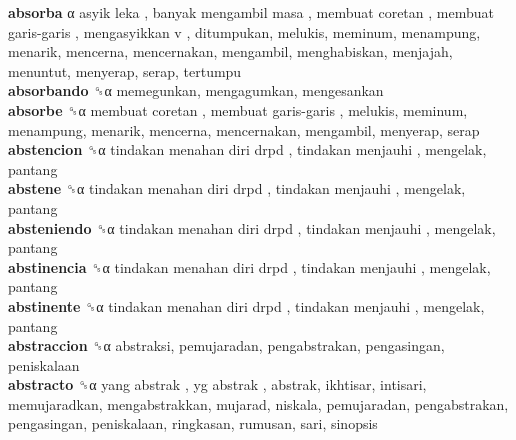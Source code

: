 \textbf{absorba} α   asyik leka ,  banyak mengambil masa ,  membuat coretan ,  membuat garis-garis ,  mengasyikkan v , ditumpukan, melukis, meminum, menampung, menarik, mencerna, mencernakan, mengambil, menghabiskan, menjajah, menuntut, menyerap, serap, tertumpu  \\
\textbf{absorbando} ␝α  memegunkan, mengagumkan, mengesankan  \\
\textbf{absorbe} ␝α   membuat coretan ,  membuat garis-garis , melukis, meminum, menampung, menarik, mencerna, mencernakan, mengambil, menyerap, serap  \\
\textbf{abstencion} ␝α   tindakan menahan diri drpd ,  tindakan menjauhi , mengelak, pantang  \\
\textbf{abstene} ␝α   tindakan menahan diri drpd ,  tindakan menjauhi , mengelak, pantang  \\
\textbf{absteniendo} ␝α   tindakan menahan diri drpd ,  tindakan menjauhi , mengelak, pantang  \\
\textbf{abstinencia} ␝α   tindakan menahan diri drpd ,  tindakan menjauhi , mengelak, pantang  \\
\textbf{abstinente} ␝α   tindakan menahan diri drpd ,  tindakan menjauhi , mengelak, pantang  \\
\textbf{abstraccion} ␝α  abstraksi, pemujaradan, pengabstrakan, pengasingan, peniskalaan  \\
\textbf{abstracto} ␝α   yang abstrak ,  yg abstrak , abstrak, ikhtisar, intisari, memujaradkan, mengabstrakkan, mujarad, niskala, pemujaradan, pengabstrakan, pengasingan, peniskalaan, ringkasan, rumusan, sari, sinopsis  \\
